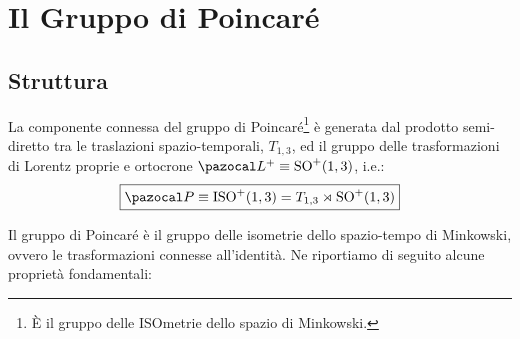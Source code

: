 \documentclass[../main.tex]{subfiles}
\begin{document}
\section{Il Gruppo di Poincaré} 
\subsection{Struttura}
La componente connessa del gruppo di Poincaré\footnote{È il gruppo delle ISOmetrie dello spazio di Minkowski.} è generata dal prodotto semi-diretto tra le traslazioni spazio-temporali, \(T_{1,3}\), ed il gruppo delle trasformazioni di Lorentz proprie e ortocrone \(\pazocal L^+ \equiv \text{SO}^+(1,3)\), i.e.:
\[
\boxed{\pazocal P \equiv \text{ISO}^+(1,3) = T_{1,3} \rtimes \text{SO}^+(1,3) }
\]

Il gruppo di Poincaré è il gruppo delle isometrie dello spazio-tempo di Minkowski, ovvero le trasformazioni connesse all'identità. Ne riportiamo di seguito alcune proprietà fondamentali:
\end{document}

